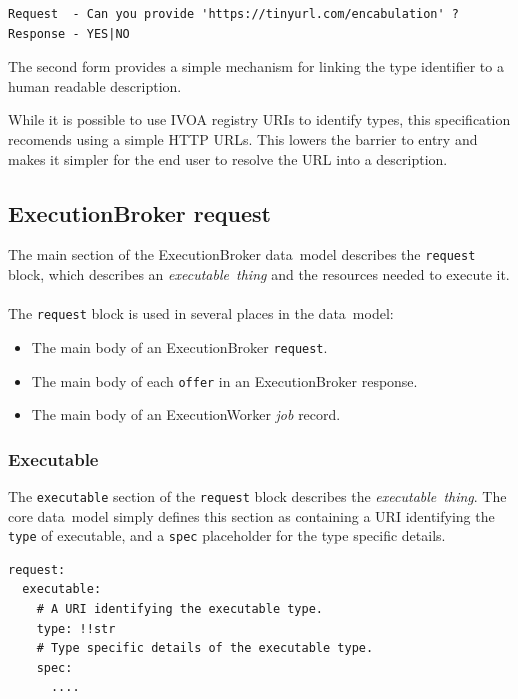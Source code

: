 \documentclass[11pt,a4paper]{ivoa}
\newcommand{\datamodel} {data~model}
\newcommand{\ivoa} {IVOA}
\newcommand{\execbrokerclass} {ExecutionBroker}
\newcommand{\execworkerclass} {ExecutionWorker}
\newcommand{\codeword}[1] {\texttt{#1}}
\newcommand{\executablething}[1] {\textit{executable~thing#1}}
\newcommand{\job} {\textit{job}}
\begin{document}
\begin{lstlisting}[]
Request  - Can you provide 'https://tinyurl.com/encabulation' ?
Response - YES|NO
\end{lstlisting}

The second form provides a simple mechanism for linking the type identifier to a human readable description.

While it is possible to use \ivoa{} registry URIs to identify types, this specification
recomends using a simple HTTP URLs. This lowers the barrier to entry and makes it simpler for the end user
to resolve the URL into a description.

\subsection{\execbrokerclass{} request}
\label{datamodel-request}

The main section of the \execbrokerclass{} \datamodel{} describes the \codeword{request} block,
which describes an \executablething{} and the resources needed to execute it.
\\
\\
The \codeword{request} block is used in several places in the \datamodel{}:
\begin{itemize}
    \item The main body of an \execbrokerclass{} \codeword{request}.
    \item The main body of each \codeword{offer} in an \execbrokerclass{} response.
    \item The main body of an \execworkerclass{} \job{} record.
\end{itemize}

\subsubsection{Executable}
\label{datamodel-executable}

The \codeword{executable} section of the \codeword{request} block describes the \executablething{}.
The core \datamodel{} simply defines this section as containing a URI identifying the \codeword{type} of executable,
and a \codeword{spec} placeholder for the type specific details.

\begin{lstlisting}[]
request:
  executable:
    # A URI identifying the executable type.
    type: !!str
    # Type specific details of the executable type.
    spec:
      ....
\end{lstlisting}
\end{document}
